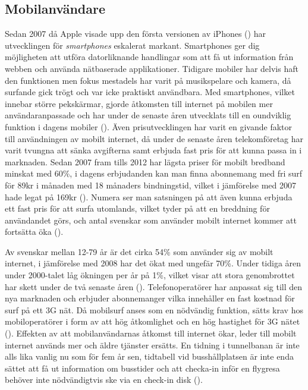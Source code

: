 \documentclass[11pt]{article}
\begin{document}
\subsection{Mobilanvändare}

Sedan 2007 då Apple visade upp den första versionen av iPhones (\cite{AppleRevolution}) har utvecklingen för \textit{smartphones} eskalerat markant. Smartphones ger dig möjligheten att utföra datorliknande handlingar som att få ut information från webben och använda nätbaserade applikationer. Tidigare mobiler har delvis haft den funktionen men fokus mestadels har varit på musikspelare och kamera, då surfande gick trögt och var icke praktiskt användbara.
Med smartphones, vilket innebar större pekskärmar, gjorde åtkomsten till internet på mobilen mer användaranpassade och har under de senaste åren utvecklats till en oundviklig funktion i dagens mobiler (\cite[s. 4]{Cfigroup_2009}).  Även prisutvecklingen har varit en givande faktor till användningen av mobilt internet, då under de senaste åren telekomföretag har varit tvungna att sänka avgifterna samt erbjuda fast pris för att kunna passa in i marknaden. Sedan 2007 fram tills 2012 har lägsta priser för mobilt bredband minskat med 60\%, i dagens erbjudanden kan man finna abonnemang med fri surf för 89kr i månaden med 18 månaders bindningstid, vilket i jämförelse med 2007 hade legat på 169kr (\cite[s. 36]{pts}). Numera ser man satsningen på att även kunna erbjuda ett fast pris för att surfa utomlands, vilket tyder på att en breddning för användandet görs, och antal svenskar som använder mobilt internet kommer att fortsätta öka (\cite{telekomidag}).

Av svenskar mellan 12-79 år är det cirka 54\% som använder sig av mobilt internet, i jämförelse med 2008 har det ökat med ungefär 70\%. Under tidiga åren under 2000-talet låg ökningen per år på 1\%, vilket visar att stora genombrottet har skett under de två senaste åren (\cite[s. 24]{.se}).  Telefonoperatörer har anpassat sig till den nya marknaden och erbjuder abonnemanger vilka innehåller en fast kostnad för surf på ett 3G nät. Då mobilsurf anses som en nödvändig funktion, sätts krav hos mobiloperatörer i form av att hög åtkomlighet och en hög hastighet för 3G nätet (\cite[s. 17]{Cfigroup_2009}). Effekten av att mobilanvändarnas åtkomst till internet ökar, leder till mobilt internet används mer och äldre tjänster ersätts. En tidning i tunnelbanan är inte alls lika vanlig nu som för fem år sen, tidtabell vid busshållplatsen är inte enda sättet att få ut information om busstider och att checka-in inför en flygresa behöver inte nödvändigtvis ske via en check-in disk (\cite{kpcb}).
\end{document}
